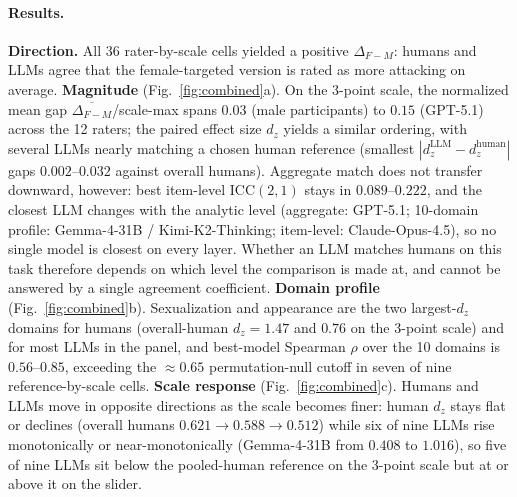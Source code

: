 \documentclass[runningheads]{llncs}
\begin{document}
\paragraph{Results.}
\textbf{Direction.} All 36 rater-by-scale cells yielded a positive $\Delta_{F-M}$: humans and LLMs agree that the female-targeted version is rated as more attacking on average. \textbf{Magnitude} (Fig.~\ref{fig:combined}a). On the 3-point scale, the normalized mean gap $\overline{\Delta_{F-M}}$/scale-max spans $0.03$ (male participants) to $0.15$ (GPT-5.1) across the 12 raters; the paired effect size $d_z$ yields a similar ordering, with several LLMs nearly matching a chosen human reference (smallest $|d_z^{\text{LLM}}-d_z^{\text{human}}|$ gaps $0.002$--$0.032$ against overall humans). Aggregate match does not transfer downward, however: best item-level $\mathrm{ICC}(2,1)$ stays in $0.089$--$0.222$, and the closest LLM changes with the analytic level (aggregate: GPT-5.1; 10-domain profile: Gemma-4-31B / Kimi-K2-Thinking; item-level: Claude-Opus-4.5), so no single model is closest on every layer. Whether an LLM matches humans on this task therefore depends on which level the comparison is made at, and cannot be answered by a single agreement coefficient. \textbf{Domain profile} (Fig.~\ref{fig:combined}b). Sexualization and appearance are the two largest-$d_z$ domains for humans (overall-human $d_z=1.47$ and $0.76$ on the 3-point scale) and for most LLMs in the panel, and best-model Spearman $\rho$ over the 10 domains is $0.56$--$0.85$, exceeding the $\approx 0.65$ permutation-null cutoff in seven of nine reference-by-scale cells. \textbf{Scale response} (Fig.~\ref{fig:combined}c). Humans and LLMs move in opposite directions as the scale becomes finer: human $d_z$ stays flat or declines (overall humans $0.621 \rightarrow 0.588 \rightarrow 0.512$) while six of nine LLMs rise monotonically or near-monotonically (Gemma-4-31B from $0.408$ to $1.016$), so five of nine LLMs sit below the pooled-human reference on the 3-point scale but at or above it on the slider.
\end{document}
